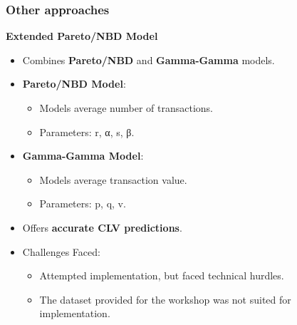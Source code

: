 \documentclass[aspectratio=169,xcolor=x11names,compress]{beamer}
\begin{document}
\begin{frame}
\frametitle{Other approaches}

\textbf{Extended Pareto/NBD Model}

\begin{itemize}
  \item Combines \textbf{Pareto/NBD} and \textbf{Gamma-Gamma} models.
  
  \item \textbf{Pareto/NBD Model}:
  \begin{itemize}
    \item Models average number of transactions.
    \item Parameters: r, α, s, β.
  \end{itemize}
  
  \item \textbf{Gamma-Gamma Model}:
  \begin{itemize}
    \item Models average transaction value.
    \item Parameters: p, q, v.
  \end{itemize}
  
  \item Offers \textbf{accurate CLV predictions}.
  
  \item Challenges Faced:
  \begin{itemize}
    \item Attempted implementation, but faced technical hurdles.
    \item The dataset provided for the workshop was not suited for implementation.
  \end{itemize}
\end{itemize}

\end{frame}
\end{document}
